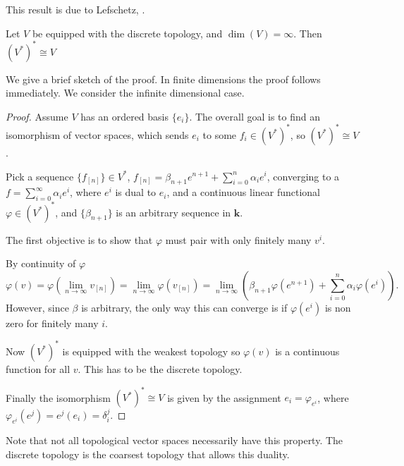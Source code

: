         This result is due to Lefschetz, \cite{lefschetz1942algebraic, leinster}.

        \begin{lem}\label{lem:dualofdiscrete}
        Let \(V\) be equipped with the discrete topology, and \( \dim(V) = \infty\). Then \((V^*)^* \cong V\) 
        \end{lem}        
        
        We give a brief sketch of the proof. In finite dimensions the proof follows immediately. We consider the infinite dimensional case.

        \begin{proof}
        Assume \(V\) has an ordered basis \( \{ e_i\}\). The overall goal is to find an isomorphism of vector spaces, which sends \(e_i \) to some \( f_i \in (V^*)^* \), so \((V^*)^* \cong V\). 
        
        Pick a sequence \( \{f_{[n]}\} \in V^*\), \( f_{[n]} = \beta_{n+1} e^{n+1} + \sum_{i=0}^n \alpha_i e^i \), converging to a \(f = \sum^{\infty}_{i=0} \alpha_i e^i\), where \(e^i\) is dual to \(e_i\), and a continuous linear functional \( \varphi \in (V^*)^*\), and \( \{\beta_{n+1}\}\) is an arbitrary sequence in \( \mathbf{k}\).
        
        The first objective is to show that \( \varphi\) must pair with only finitely many \(v^i\).
    
        By continuity of \(\varphi\)
        \[ \varphi(v) = \varphi \left( \lim_{n\rightarrow \infty} v_{[n]} \right) = \lim_{n\rightarrow \infty} \varphi(v_{[n]}) = \lim_{n\rightarrow \infty} \left(  \beta_{n+1} \varphi( e^{n+1} ) + \sum_{i=0}^n \alpha_i \varphi(e^i) \right) . \]
        However, since \( \beta\) is arbitrary, the only way this can converge is if \( \varphi(e^i)\) is non zero for finitely many \(i\). 

        Now \((V^*)^*\) is equipped with the weakest topology so \( \varphi(v)\) is a continuous function for all \(v\). This has to be the discrete topology.
        
        Finally the isomorphism \( (V^*)^* \cong V\) is given by the assignment  \( e_i = \varphi_{e^i}\), where \( \varphi_{e^i}( e^j) = e^j(e_i) = \delta^j_i\).
        \end{proof}
        
        Note that not all topological vector spaces necessarily have this property. The discrete topology is the coarsest topology that allows this duality.
        
